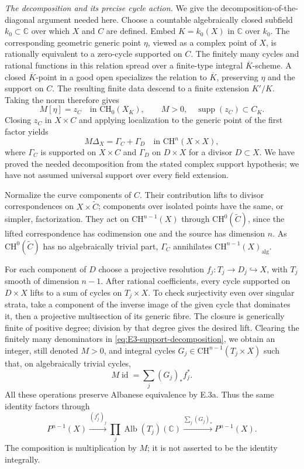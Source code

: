 \emph{The decomposition and its precise cycle action.}
We give the decomposition-of-the-diagonal argument needed here.
Choose a countable algebraically closed subfield $k_0\subset\mathbb C$
over which $X$ and $C$ are defined. Embed $K=k_0(X)$ in $\mathbb C$
over $k_0$. The corresponding geometric generic point $\eta$,
viewed as a complex point of $X$, is rationally equivalent to a
zero-cycle supported on $C$. The finitely many cycles and rational
functions in this relation spread over a finite-type integral
$\overline K$-scheme. A closed $\overline K$-point in a good open
specializes the relation to $\overline K$, preserving $\eta$ and
the support on $C$. The resulting finite data descend to a finite
extension $K'/K$. Taking the norm therefore gives
\[
 M[\eta]=z_C\quad\text{in }\mathrm{CH}_0(X_K),
 \qquad M>0,\quad\operatorname{supp}(z_C)\subset C_K.
\]
Closing $z_C$ in $X\times C$ and applying localization to the
generic point of the first factor yields
\begin{equation}\label{eq:E3-support-decomposition}
 M\Delta_X=\Gamma_C+\Gamma_D\quad\text{in }\mathrm{CH}^n(X\times X),
\end{equation}
where $\Gamma_C$ is supported on $X\times C$ and $\Gamma_D$ on
$D\times X$ for a divisor $D\subset X$. We have proved the
needed decomposition from the stated complex support hypothesis;
we have not assumed universal support over every field extension.

Normalize the curve components of $C$. Their contribution lifts
to divisor correspondences on $X\times\widetilde C$; components
over isolated points have the same, or simpler, factorization.
They act on $\mathrm{CH}^{n-1}(X)$ through
$\mathrm{CH}^{0}(\widetilde C)$, since the lifted correspondence
has codimension one and the source has dimension $n$.
As $\mathrm{CH}^{0}(\widetilde C)$ has no algebraically trivial
part, $\Gamma_C$ annihilates
$\mathrm{CH}^{n-1}(X)_{\mathrm{alg}}$.

For each component of $D$ choose a projective resolution
$f_j:T_j\to D_j\hookrightarrow X$, with $T_j$ smooth of
dimension $n-1$. After rational coefficients, every cycle
supported on $D\times X$ lifts to a sum of cycles on
$T_j\times X$. To check surjectivity even over singular strata,
take a component of the inverse image of the given cycle that
dominates it, then a projective multisection of its generic
fibre. The closure is generically finite of positive degree;
division by that degree gives the desired lift. Clearing the
finitely many denominators in \eqref{eq:E3-support-decomposition},
we obtain an integer, still denoted $M>0$, and integral cycles
$G_j\in\mathrm{CH}^{n-1}(T_j\times X)$ such that, on
algebraically trivial cycles,
\[
 M\operatorname{id}
       =\sum_j(G_j)_*f_j^*.
\]
All these operations preserve Albanese equivalence by E.3a.
Thus the same identity factors through
\begin{equation}\label{eq:E3-Alb-factorization}
 P^{n-1}(X)\xrightarrow{(f_j^*)_j}
       \prod_j\operatorname{Alb}(T_j)(\mathbb C)
       \xrightarrow{\sum_j(G_j)_*}P^{n-1}(X).
\end{equation}
The composition is multiplication by $M$; it is not asserted
to be the identity integrally.

